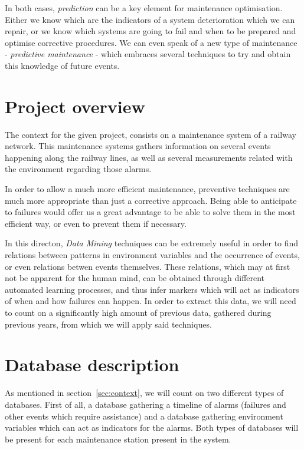 \documentclass[a4paper,10pt]{article}
\begin{document}
In both cases, \emph{prediction} can be a key element for maintenance optimisation. Either we know which are the indicators of a system deterioration which we can repair, or we know which systems are going to fail and when to be prepared and optimise corrective procedures. We can even speak of a new type of maintenance - \emph{predictive maintenance} - which embraces several techniques to try and obtain this knowledge of future events.

\section{Project overview}

The context for the given project, consists on a maintenance system of a railway network. This maintenance systems gathers information on several events happening along the railway lines, as well as several measurements related with the environment regarding those alarms.

In order to allow a much more efficient maintenance, preventive techniques are much more appropriate than just a corrective approach. Being able to anticipate to failures would offer us a great advantage to be able to solve them in the most efficient way, or even to prevent them if necessary.

In this directon, \emph{Data Mining} techniques can be extremely useful in order to find relations between patterns in environment variables and the occurrence of events, or even relations betwen events themselves. These relations, which may at first not be apparent for the human mind, can be obtained through different automated learning processes, and thus infer markers which will act as indicators of when and how failures can happen. In order to extract this data, we will need to count on a significantly high amount of previous data, gathered during previous years, from which we will apply said techniques.

\section{Database description}
As mentioned in section~\ref{sec:context}, we will count on two different types of databases. First of all, a database gathering a timeline of alarms (failures and other events which require assistance) and a database gathering environment variables which can act as indicators for the alarms. Both types of databases will be present for each maintenance station present in the system.
\end{document}
